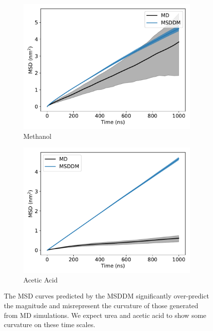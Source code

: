 \documentclass{article}
\begin{document}
\begin{figure}
\begin{subfigure}{0.45\textwidth}
  \includegraphics[width=\textwidth]{MET_msddm.pdf}
  \caption{Methanol}\label{fig:MET_msddm}
  \end{subfigure}
  \begin{subfigure}{0.45\textwidth}
  \includegraphics[width=\textwidth]{ACH_msddm.pdf}
  \caption{Acetic Acid}\label{fig:ACH_msddm}
  \end{subfigure}
  \caption{The MSD curves predicted by the MSDDM significantly over-predict the
  magnitude and misrepresent the curvature of those generated from MD simulations.
  We expect urea and acetic acid to show some curvature on these time scales.}\label{fig:msddm_performance}
  \end{figure}
  
\end{document}
